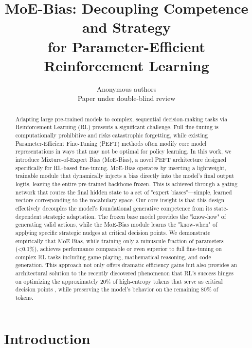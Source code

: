 \documentclass{article}
\title{MoE-Bias: Decoupling Competence and Strategy \\ for Parameter-Efficient Reinforcement Learning}
\author{Anonymous authors\\ Paper under double-blind review}
\begin{document}
\maketitle

\begin{abstract}
Adapting large pre-trained models to complex, sequential decision-making tasks via Reinforcement Learning (RL) presents a significant challenge. Full fine-tuning is computationally prohibitive and risks catastrophic forgetting, while existing Parameter-Efficient Fine-Tuning (PEFT) methods often modify core model representations in ways that may not be optimal for policy learning. In this work, we introduce Mixture-of-Expert Bias (MoE-Bias), a novel PEFT architecture designed specifically for RL-based fine-tuning. MoE-Bias operates by inserting a lightweight, trainable module that dynamically injects a bias directly into the model's final output logits, leaving the entire pre-trained backbone frozen. This is achieved through a gating network that routes the final hidden state to a set of "expert biases"—simple, learned vectors corresponding to the vocabulary space. Our core insight is that this design effectively decouples the model's foundational generative competence from its state-dependent strategic adaptation. The frozen base model provides the "know-how" of generating valid actions, while the MoE-Bias module learns the "know-when" of applying specific strategic nudges at critical decision points. We demonstrate empirically that MoE-Bias, while training only a minuscule fraction of parameters (<0.1\%), achieves performance comparable or even superior to full fine-tuning on complex RL tasks including game playing, mathematical reasoning, and code generation. This approach not only offers dramatic efficiency gains but also provides an architectural solution to the recently discovered phenomenon that RL's success hinges on optimizing the approximately 20\% of high-entropy tokens that serve as critical decision points \citep{wang2025highentropy}, while preserving the model's behavior on the remaining 80\% of tokens.
\end{abstract}


\section{Introduction}
\end{document}
